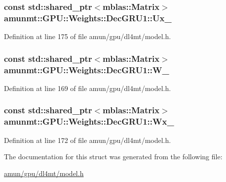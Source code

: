 \subsubsection[{\texorpdfstring{Ux\+\_\+}{Ux_}}]{\setlength{\rightskip}{0pt plus 5cm}const std\+::shared\+\_\+ptr$<${\bf mblas\+::\+Matrix}$>$ amunmt\+::\+G\+P\+U\+::\+Weights\+::\+Dec\+G\+R\+U1\+::\+Ux\+\_\+}\hypertarget{structamunmt_1_1GPU_1_1Weights_1_1DecGRU1_a2c7bfd93f295a9f704bcb1de1458db7b}{}\label{structamunmt_1_1GPU_1_1Weights_1_1DecGRU1_a2c7bfd93f295a9f704bcb1de1458db7b}


Definition at line 175 of file amun/gpu/dl4mt/model.\+h.

\subsubsection[{\texorpdfstring{W\+\_\+}{W_}}]{\setlength{\rightskip}{0pt plus 5cm}const std\+::shared\+\_\+ptr$<${\bf mblas\+::\+Matrix}$>$ amunmt\+::\+G\+P\+U\+::\+Weights\+::\+Dec\+G\+R\+U1\+::\+W\+\_\+}\hypertarget{structamunmt_1_1GPU_1_1Weights_1_1DecGRU1_a9480119e5301b85d6a2804d61891d82a}{}\label{structamunmt_1_1GPU_1_1Weights_1_1DecGRU1_a9480119e5301b85d6a2804d61891d82a}


Definition at line 169 of file amun/gpu/dl4mt/model.\+h.

\subsubsection[{\texorpdfstring{Wx\+\_\+}{Wx_}}]{\setlength{\rightskip}{0pt plus 5cm}const std\+::shared\+\_\+ptr$<${\bf mblas\+::\+Matrix}$>$ amunmt\+::\+G\+P\+U\+::\+Weights\+::\+Dec\+G\+R\+U1\+::\+Wx\+\_\+}\hypertarget{structamunmt_1_1GPU_1_1Weights_1_1DecGRU1_a911a6f9ac87cf95a39a43a75d521a259}{}\label{structamunmt_1_1GPU_1_1Weights_1_1DecGRU1_a911a6f9ac87cf95a39a43a75d521a259}


Definition at line 172 of file amun/gpu/dl4mt/model.\+h.



The documentation for this struct was generated from the following file\+:\begin{DoxyCompactItemize}
\item 
\hyperlink{amun_2gpu_2dl4mt_2model_8h}{amun/gpu/dl4mt/model.\+h}\end{DoxyCompactItemize}
